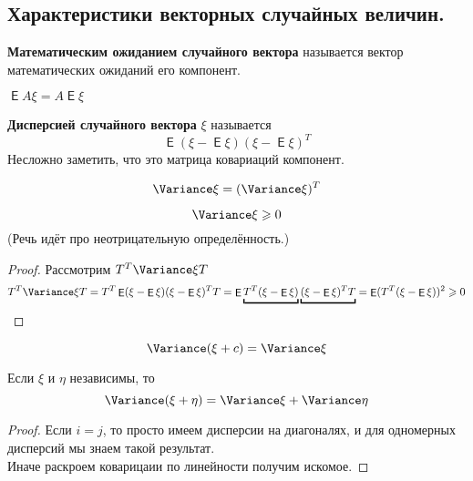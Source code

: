 \documentclass{article}
\DeclareMathOperator{\Expected}{\mathsf{E}}
\begin{document}
    \subsection{Характеристики векторных случайных величин.}
    \begin{definition}
        \textbf{Математическим ожиданием случайного вектора} называется вектор математических ожиданий его компонент.
    \end{definition}
    \begin{theorem}
        $\Expected A\xi=A\Expected\xi$
    \end{theorem}
    \begin{definition}
        \textbf{Дисперсией случайного вектора} $\xi$ называется
        $$
        \Expected(\xi-\Expected\xi)(\xi-\Expected\xi)^T
        $$
        Несложно заметить, что это матрица ковариаций компонент.
    \end{definition}
    \begin{property}
        $$
        \Variance\xi=(\Variance\xi)^T
        $$
    \end{property}
    \begin{property}
        $$
        \Variance\xi\geqslant0
        $$
        (Речь идёт про неотрицательную определённость.)
    \end{property}
    \begin{proof}
        Рассмотрим $T^T\Variance\xi T$
        $$
        T^T\Variance\xi T=T^T\Expected(\xi-\Expected\xi)(\xi-\Expected\xi)^TT=\Expected\underbracket{T^T(\xi-\Expected\xi)}\underbracket{(\xi-\Expected\xi)^TT}=\Expected(T^T(\xi-\Expected\xi))^2\geqslant0
        $$
    \end{proof}
    \begin{property}
        $$
        \Variance(\xi+c)=\Variance\xi
        $$
    \end{property}
    \begin{property}
        Если $\xi$ и $\eta$ независимы, то
        $$
        \Variance(\xi+\eta)=\Variance\xi+\Variance\eta
        $$
    \end{property}
    \begin{proof}
        Если $i=j$, то просто имеем дисперсии на диагоналях, и для одномерных дисперсий мы знаем такой результат.\\
        Иначе раскроем коварицаии по линейности  получим искомое.
    \end{proof}
\end{document}
